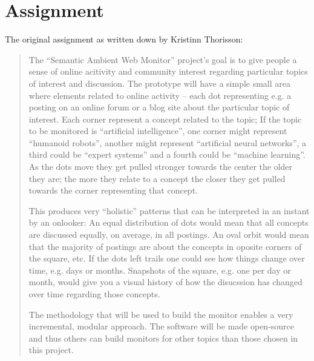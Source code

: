 \chapter{\label{cpt:assignment}Assignment}

The original assignment as written down by Kristinn Thorisson:

\begin{quote}

  The ``Semantic Ambient Web Monitor'' project's goal is to give people a sense
  of online acitivity and community interest regarding particular topics of
  interest and discussion. The prototype will have a simple small area where
  elements related to online activity -- each dot representing e.g. a posting
  on an online forum or a blog site about the particular topic of interest.
  Each corner represent a concept related to the topic; If the topic to be
  monitored is ``artificial intelligence'', one corner might represent
  ``humanoid robots'', another might represent ``artificial neural networks'',
  a third could be ``expert systems'' and a fourth could be ``machine
  learning''. As the dots move they get pulled stronger towards the center the
  older they are; the more they relate to a concept the closer they get pulled
  towards the corner representing that concept.

  This produces very ``holistic'' patterns that can be interpreted in an
  instant by an onlooker: An equal distribution of dots would mean that all
  concepts are discussed equally, on average, in all postings. An oval orbit
  would mean that the majority of postings are about the concepts in oposite
  corners of the square, etc. If the dots left trails one could see how things
  change over time, e.g. days or months. Snapshots of the square, e.g. one per
  day or month, would give you a visual history of how the disucssion has
  changed over time regarding those concepts.

  The methodology that will be used to build the monitor enables a very
  incremental, modular approach. The software will be made open-source and thus
  others can build monitors for other topics than those chosen in this project.

\end{quote}

